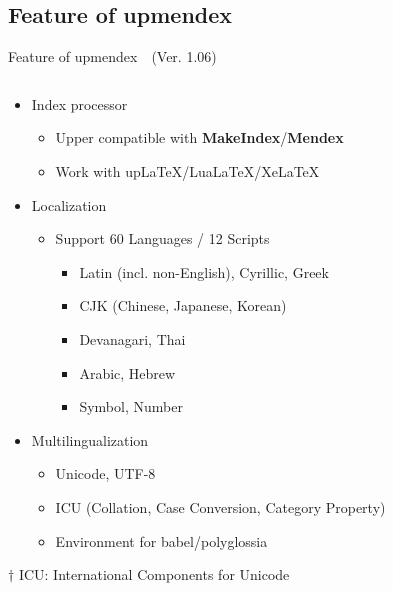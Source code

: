 \documentclass[aspectratio=169,10pt]{beamer}
\begin{document}
\subsection{Feature of upmendex}
\begin{frame}{Feature of upmendex~~{\scriptsize (Ver. 1.06)}}
\renewcommand{\thefootnote}{$\dagger$}
\begin{columns}
\begin{column}{120mm}
\begin{center}
  \begin{itemize}
  \item Index processor
    \begin{itemize}
    \item Upper compatible with \textbf{MakeIndex}/\textbf{Mendex}
    \item Work with upLaTeX/LuaLaTeX/XeLaTeX
    \end{itemize}
  \item Localization
    \begin{itemize}
    \item Support 60 Languages / 12 Scripts
      \begin{itemize}
      \item Latin (incl. non-English), Cyrillic, Greek
      \item CJK (Chinese, Japanese, Korean)
      \item Devanagari, Thai
      \item Arabic, Hebrew
      \item Symbol, Number
      \end{itemize}
    \end{itemize}
  \item Multilingualization
    \begin{itemize}
    \item Unicode, UTF-8
    \item ICU\footnotemark{} (Collation, Case Conversion, Category Property)
    \item Environment for babel/polyglossia
    \end{itemize}
  \end{itemize}
\end{center}
\vspace{2mm}
{\footnotesize $\dagger$ ICU: International Components for Unicode}
\end{column}
\end{columns}
\end{frame}
\end{document}
